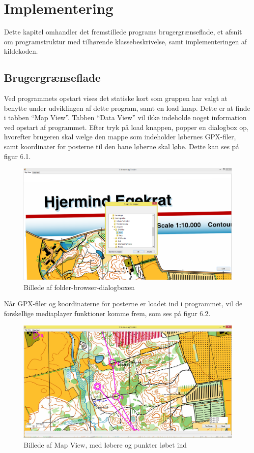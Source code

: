 \chapter{Implementering}
Dette kapitel omhandler det fremstillede programs brugergrænseflade, et afsnit om programstruktur med tilhørende klassebeskrivelse, samt implementeringen af kildekoden.

\section{Brugergrænseflade}
Ved programmets opstart vises det statiske kort som gruppen har valgt at benytte under udviklingen af dette program, samt en load knap. Dette er at finde i tabben “Map View”. Tabben “Data View” vil ikke indeholde noget information ved opstart af programmet. Efter tryk på load knappen,	 popper en dialogbox op, hvorefter brugeren skal vælge den mappe som indeholder løbernes GPX-filer, samt koordinater for posterne til den bane løberne skal løbe. Dette kan ses på figur 6.1.

\begin{figure} [h]
	\centering
	\includegraphics[width=1\textwidth]{billeder/MapView1}
	\caption{Billede af folder-browser-dialogboxen}
\end{figure}

Når GPX-filer og koordinaterne for posterne er loadet ind i programmet, vil de forskellige mediaplayer funktioner komme frem, som ses på figur 6.2.

\begin{figure} [h]
	\centering
	\includegraphics[width=1\textwidth]{billeder/MapView2}
	\caption{Billede af Map View, med løbere og punkter løbet ind}
\end{figure}

